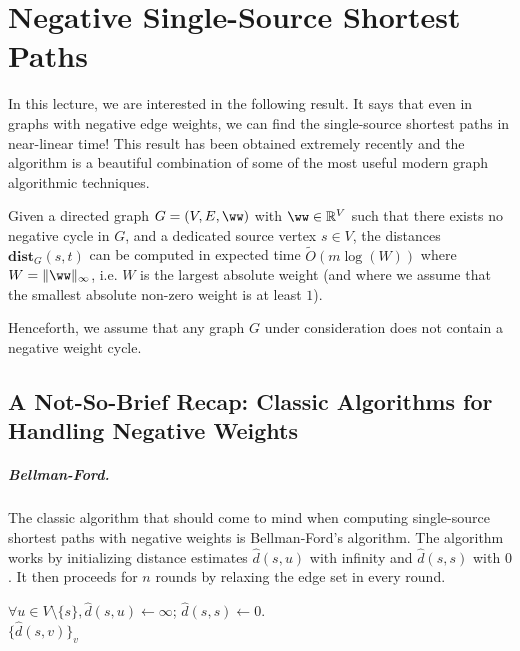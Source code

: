 
\chapter{Negative Single-Source Shortest Paths}

In this lecture, we are interested in the following result. It says that even in graphs with negative edge weights, we can find the single-source shortest paths in near-linear time! This result has been obtained extremely recently and the algorithm is a beautiful combination of some of the most useful modern graph algorithmic techniques.

\begin{theorem}\label{thm:negativeSSSPBNW}
Given a directed graph $G=(V,E, \ww)$ with $\ww \in \mathbb{R}^V$ such that there exists no negative cycle in $G$, and a dedicated source vertex $s \in V$, the distances $\mathbf{dist}_G(s,t)$ can be computed in expected time $\tilde{O}(m \log(W))$ where $W = \|\ww\|_{\infty}$, i.e. $W$ is the largest absolute weight (and where we assume that the smallest absolute non-zero weight is at least $1$).
\end{theorem}

Henceforth, we assume that any graph $G$ under consideration does not contain a negative weight cycle.

\section{A Not-So-Brief Recap: Classic Algorithms for Handling Negative Weights}

\paragraph{Bellman-Ford.} The classic algorithm that should come to mind when computing single-source shortest paths with negative weights is Bellman-Ford's algorithm. The algorithm works by initializing distance estimates $\hat{d}(s, u)$ with infinity and $\hat{d}(s,s)$ with $0$. It then proceeds for $n$ rounds by relaxing the edge set in every round. 

\begin{algorithm}
$\forall u \in V \setminus \{s\}, \hat{d}(s, u) \gets \infty$; $\hat{d}(s,s) \gets 0$.\\
\Return $\{\hat{d}(s, v) \}_v$
\caption{$\textsc{BellmanFord}(G,s)$}
\label{alg:bellmanFord}
\end{algorithm}

